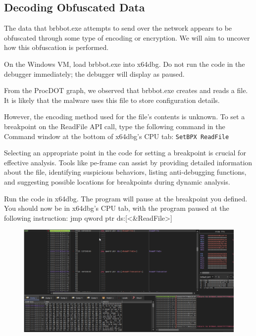 \documentclass[]{project_plan}
\begin{document}
\subsection{Decoding Obfuscated Data}

The data that brbbot.exe attempts to send over the network appears to be
obfuscated through some type of encoding or encryption. We will aim
to uncover how this obfuscation is performed.

On the Windows VM, load brbbot.exe into x64dbg.
Do not run the code in the debugger immediately; the debugger
will display as paused.

From the ProcDOT graph, we observed that brbbot.exe creates and reads
a file. It is likely that the malware uses this file to store configuration details.

However, the encoding method used for the file’s contents is unknown.
To set a breakpoint on the ReadFile API call, type the following command
in the Command window at the bottom of x64dbg’s CPU tab:
\lstinline|SetBPX ReadFile|

Selecting an appropriate point in the code for setting a
breakpoint is crucial for effective analysis. Tools like pe-frame
can assist by providing detailed information about the
file, identifying suspicious behaviors, listing anti-debugging
functions, and suggesting possible locations for breakpoints
during dynamic analysis.

Run the code in x64dbg. The
program will pause at the breakpoint you defined. You should now be in
x64dbg’s CPU tab, with the program paused at the following instruction:
jmp qword ptr ds:[<\&ReadFile>]


\begin{figure}[H]
  \centering
  \includegraphics[width=\linewidth]{ptr ds.png}
\end{figure}
\end{document}
